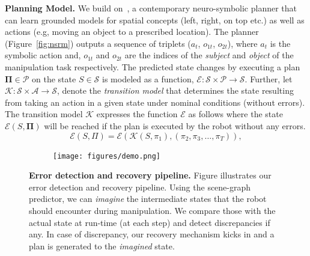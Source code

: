 %
\textbf{Planning Model. }
%
We build on~\citep{Kalithasan2022LearningNP}, a contemporary neuro-symbolic planner that can learn grounded models for spatial concepts (left, right, on top etc.) as well as actions (e.g, moving an object to a prescribed location). 
%
The planner (Figure~\ref{fig:nsrm}) outputs a sequence of triplets ($a_t$, $o_{1t}$, $o_{2t}$), where $a_t$ is the symbolic action and, $o_{1t}$ and $o_{2t}$ are the indices of the \textit{subject} and \textit{object} of the manipulation task respectively. 
%
The predicted state changes by executing a plan $\mathbf{\Pi} \in \mathcal{P}$ on the state $S \in \mathcal{S}$ is modeled as a function, $\mathcal{E}: \mathcal{S} \times \mathcal{P} \rightarrow \mathcal{S}$. 
%
Further, let $\mathcal{K}: \mathcal{S} \times \mathcal{A} \rightarrow \mathcal{S}$, denote the \emph{transition model} that determines the state resulting from taking an action in a given state under nominal conditions (without errors). The transition model  $\mathcal{K}$ expresses the function $\mathcal{E}$ as follows where the state $\mathcal{E}(S, \mathbf{\Pi})$ will be reached if the plan is executed by the robot without any errors. 
%
\begin{equation}
    \mathcal{E}(S, \Pi) = \mathcal{E}(\mathcal{K}(S, \pi_1), (\pi_2, \pi_3, \dots, \pi_T)),
\end{equation}

\begin{figure}[t!]
    \begin{subfigure}{1.0\hsize}
         \centering    
         \texttt{[image: figures/demo.png]}
    \end{subfigure}
    \caption{
        \footnotesize{
            \textbf{Error detection and recovery pipeline.}
            Figure illustrates our error detection and recovery pipeline. Using the scene-graph predictor, we can \textit{imagine} the intermediate states that the robot should encounter during manipulation. We compare those with the actual state at run-time (at each step) and detect discrepancies if any. In case of discrepancy, our recovery mechanism kicks in and a plan is generated to the \textit{imagined} state. 
        }
    }
    \vspace{-0.15in}
    \label{fig:rollout}
\end{figure}

